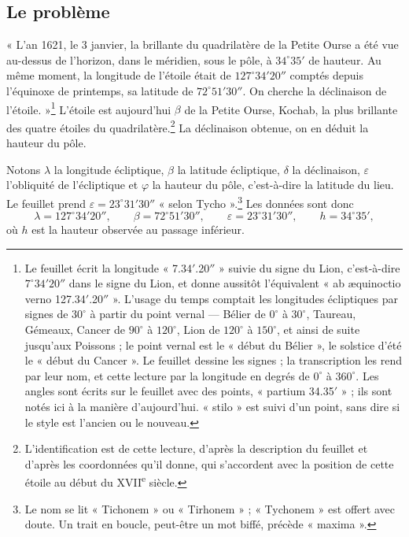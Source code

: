 \documentclass[11pt,a4paper]{article}
\begin{document}
\subsection*{Le problème}

« L'an 1621, le 3 janvier, la brillante du quadrilatère de la Petite Ourse a
été vue au-dessus de l'horizon, dans le méridien, sous le pôle, à
$34^\circ 35'$ de hauteur. Au même moment, la longitude de l'étoile était de
$127^\circ 34' 20''$ comptés depuis l'équinoxe de printemps, sa latitude de
$72^\circ 51' 30''$. On cherche la déclinaison de l'étoile. »\footnote{Le
feuillet écrit la longitude « 7.34$'$.20$''$ » suivie du signe du Lion,
c'est-à-dire $7^\circ 34' 20''$ dans le signe du Lion, et donne aussitôt
l'équivalent « ab æquinoctio verno 127.34$'$.20$''$ ». L'usage du temps
comptait les longitudes écliptiques par signes de $30^\circ$ à partir du point
vernal — Bélier de $0^\circ$ à $30^\circ$, Taureau, Gémeaux, Cancer de
$90^\circ$ à $120^\circ$, Lion de $120^\circ$ à $150^\circ$, et ainsi de suite
jusqu'aux Poissons ; le point vernal est le « début du Bélier », le solstice
d'été le « début du Cancer ». Le feuillet dessine les signes ; la
transcription les rend par leur nom, et cette lecture par la longitude en
degrés de $0^\circ$ à $360^\circ$. Les angles sont écrits sur le feuillet avec
des points, « partium 34.35$'$ » ; ils sont notés ici à la manière d'aujourd'hui.
« stilo » est suivi d'un point, sans dire si le style est l'ancien ou le
nouveau.} L'étoile est aujourd'hui $\beta$ de la Petite Ourse, Kochab, la plus
brillante des quatre étoiles du quadrilatère.\footnote{L'identification est de
cette lecture, d'après la description du feuillet et d'après les coordonnées
qu'il donne, qui s'accordent avec la position de cette étoile au début du
XVII\textsuperscript{e} siècle.} La déclinaison obtenue, on en déduit
la hauteur du pôle.

Notons $\lambda$ la longitude écliptique, $\beta$ la latitude écliptique,
$\delta$ la déclinaison, $\varepsilon$ l'obliquité de l'écliptique et $\varphi$
la hauteur du pôle, c'est-à-dire la latitude du lieu. Le feuillet prend
$\varepsilon = 23^\circ 31' 30''$ « selon Tycho ».\footnote{Le nom se lit
« Tichonem » ou « Tirhonem » ; « Tychonem » est offert avec doute. Un trait en
boucle, peut-être un mot biffé, précède « maxima ».} Les données sont donc
\[
\lambda = 127^\circ 34' 20'', \qquad \beta = 72^\circ 51' 30'', \qquad
\varepsilon = 23^\circ 31' 30'', \qquad h = 34^\circ 35',
\]
où $h$ est la hauteur observée au passage inférieur.
\end{document}

